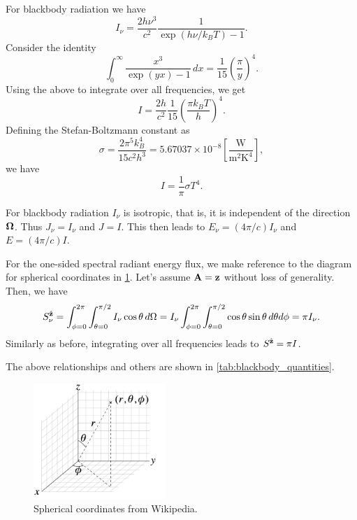 \documentclass[a4paper,11pt]{article}
\begin{document}
For blackbody radiation we have
\begin{equation}
    I_\nu = \frac{2h\nu^3}{c^2} \frac{1}{\exp(h\nu/k_BT) - 1}.
\end{equation}
Consider the identity 
\begin{equation}
    \int_0^\infty \frac{x^3}{\exp(yx) - 1} \, dx = \frac{1}{15} \left ( \frac{\pi}{y} \right )^4.
\end{equation}
Using the above to integrate over all frequencies, we get
\begin{equation}
    I = \frac{2h}{c^2} \frac{1}{15} \left ( \frac{ \pi k_BT}{h} \right )^4.
\end{equation}
Defining the Stefan-Boltzmann constant as
\begin{equation}
    \sigma = \frac{2 \pi^5 k_B^4}{15 c^2 h^3} = 5.67037 \times 10^{-8} \left [ \frac{\text{W}}{\text{m}^2 \text{K}^4} \right ],
\end{equation}
we have
\begin{equation}
    I = \frac{1}{\pi} \sigma T^4.
\end{equation}

For blackbody radiation $I_\nu$ is isotropic, that is, it is independent of the direction $\bm \Omega$. Thus $J_\nu = I_\nu$ and $J = I$. This then leads to $E_\nu = (4\pi/c) I_\nu$ and  $E = (4\pi/c) I$.
    
For the one-sided spectral radiant energy flux, we make reference to the diagram for spherical coordinates in \cref{fig:spherical_coordinates}. Let's assume $\mathbf{A} = \mathbf{z}$ without loss of generality. Then, we have
\begin{equation}
    S_\nu^{\hat{\mathbf{z}}} = \int_{\phi = 0}^{2\pi} \int_{\theta=0}^{\pi/2} I_\nu \cos \theta \, d\Omega = I_\nu \int_{\phi = 0}^{2\pi} \int_{\theta=0}^{\pi/2} \cos \theta \sin \theta \, d\theta d\phi = \pi I_\nu.
\end{equation}
Similarly as before, integrating over all frequencies leads to $S^{\hat{\mathbf{z}}} = \pi I$.
    
The above relationships and others are shown in \cref{tab:blackbody_quantities}. 

\begin{figure}[ht]
    \centering
    \includegraphics[width=5cm]{../../../images/spherical_coords_wiki.png}
    \caption{Spherical coordinates from Wikipedia.}
    \label{fig:spherical_coordinates}
\end{figure}
\end{document}
